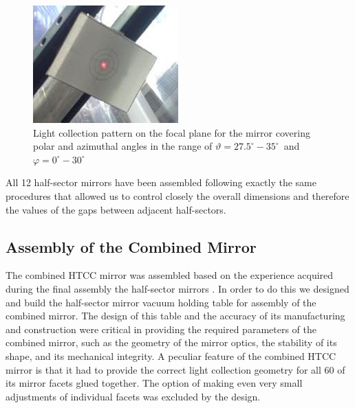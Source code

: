 \begin{figure}[ht]
    \centering
    \includegraphics[width=0.95\linewidth]{images/Focal_Plane_1R.jpg}
    \caption{Light collection pattern on the focal plane for the mirror covering polar and azimuthal angles in the range of $\vartheta = 27.5^\circ - 35^\circ$\, and\, $\varphi = 0^\circ - 30^\circ$}
    \label{fig:Focal_Plane_1R}
\end{figure}

\indent All 12 half-sector mirrors have been assembled following exactly the same procedures that allowed us to control closely the overall dimensions and therefore the values of the gaps between adjacent half-sectors. 

\subsection{Assembly of the Combined Mirror}

 The combined HTCC mirror was assembled based on the experience acquired during the final assembly the half-sector mirrors . In order to do this we designed and build the half-sector mirror vacuum holding table for assembly of the combined mirror. The design of this table and the accuracy of its manufacturing and construction were critical in providing the required parameters of the combined mirror, such as the geometry of the mirror optics, the stability of its shape, and its mechanical integrity. A peculiar feature of the combined HTCC mirror is that it had to provide the correct light collection geometry for all 60 of its mirror facets glued together. The option of making even very small adjustments of individual facets was excluded by the design.
 
